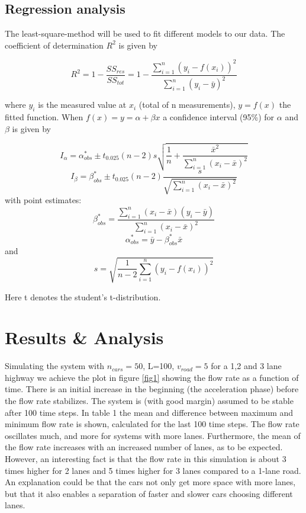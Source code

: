 \documentclass[a4paper,12pt]{article}
\begin{document}
\subsection{Regression analysis}
The least-square-method will be used to fit different models to our data. The coefficient of determination $R^2$ is given by

\begin{equation}
R^2 = 1 - \frac{SS_{res}}{SS_{tot}} = 1 - \frac{\sum_{i=1}^{n} (y_i-f(x_i))^2} {\sum_{i=1}^{n} (y_i-\bar{y})^2}
\end{equation} 

where $y_i$ is the measured value at $x_i$ (total of n measurements), $y = f(x)$ the fitted function. When $f(x) = y = \alpha+\beta x$ a confidence interval (95\%) for $\alpha$ and $\beta$ is given by

\begin{equation}
	I_{ \alpha }= \alpha^*_{obs} \pm t_{0.025}(n-2)s\sqrt{\frac{1}{n}+\frac{\bar{x}^2}{\sum_{i=1}^n(x_i-\bar{x})^2}}
\end{equation}
\begin{equation}
	I_{ \beta }= \beta^*_{obs} \pm t_{0.025}(n-2)\frac{s}{\sqrt{\sum_{i=1}^n(x_i-\bar{x})^2}}
\end{equation} 
with point estimates:
\begin{equation}
\beta^*_{obs} = \frac{\sum_{i=1}^n (x_i-\bar{x})(y_i-\bar{y})}{\sum_{i=1}^n (x_i-\bar{x})^2}
\end{equation}
\begin{equation}
\alpha^*_{obs}= \bar{y} - \beta^*_{obs}\bar{x}
\end{equation}
and 
\begin{equation}
s = \sqrt{\frac{1}{n-2}\sum_{i=1}^n(y_i-f(x_i))^2}
\end{equation}

Here t denotes the student's t-distribution.
\newpage
\section{Results \& Analysis}
Simulating the system with $n_{cars}=50$, L=100, $v_{road}=5$ for a 1,2 and 3 lane highway we achieve the plot in figure \ref{fig1} showing the flow rate as a function of time. There is an initial increase in the beginning (the acceleration phase) before the flow rate stabilizes. The system is (with good margin) assumed to be stable after 100 time steps. In table 1 the mean and difference between maximum and minimum flow rate is shown, calculated for the last 100 time steps. The flow rate oscillates much, and more for systems with more lanes. Furthermore, the mean of the flow rate increases with an increased number of lanes, as to be expected. However, an interesting fact is that the flow rate in this simulation is about 3 times higher for 2 lanes and 5 times higher for 3 lanes compared to a 1-lane road. An explanation could be that the cars not only get more space with more lanes, but that it also enables a separation of faster and slower cars choosing different lanes.
\end{document}
